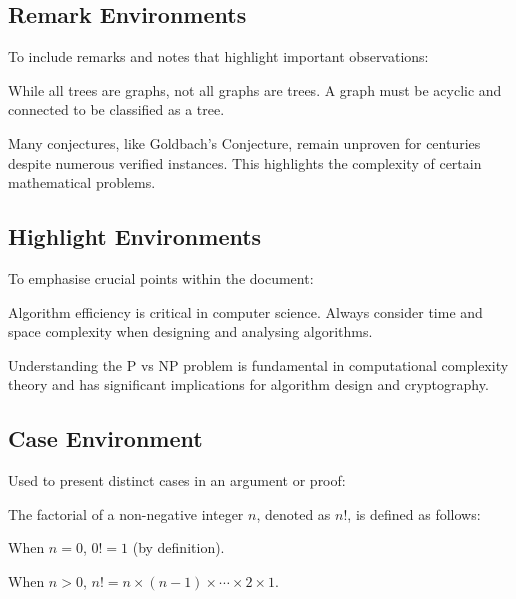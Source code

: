 \documentclass{ltxdoc}
\begin{document}
\subsection{Remark Environments}

To include remarks and notes that highlight important observations:

\begin{remark}
	While all trees are graphs, not all graphs are trees. A graph must be acyclic and connected to be classified as a tree.
\end{remark}

\begin{note}
	Many conjectures, like Goldbach's Conjecture, remain unproven for centuries despite numerous verified instances. This highlights the complexity of certain mathematical problems.
\end{note}

\subsection{Highlight Environments}

To emphasise crucial points within the document:

\begin{important}
	Algorithm efficiency is critical in computer science. Always consider time and space complexity when designing and analysing algorithms.
\end{important}

\begin{keypoint}
	Understanding the P vs NP problem is fundamental in computational complexity theory and has significant implications for algorithm design and cryptography.
\end{keypoint}

\subsection{Case Environment}

Used to present distinct cases in an argument or proof:

\begin{theorem}
	The factorial of a non-negative integer $n$, denoted as $n!$, is defined as follows:
\end{theorem}

\begin{case}
	\item When $n = 0$, $0! = 1$ (by definition).
	\item When $n > 0$, $n! = n \times (n-1) \times \cdots \times 2 \times 1$.
\end{case}
\end{document}
